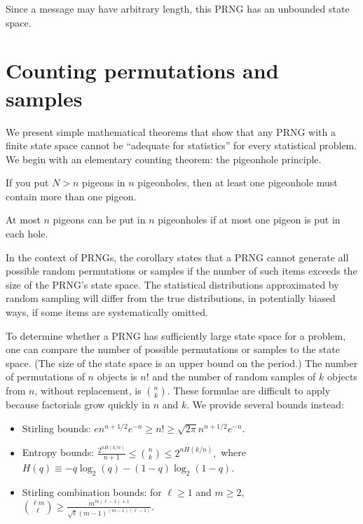\documentclass[graybox]{svmult}
\begin{document}
Since a message may have arbitrary length, this PRNG has an unbounded state space.


\section{Counting permutations and samples}
\label{sec:count}

We present simple mathematical theorems that show that any PRNG with a finite state space
cannot be ``adequate for statistics'' for every statistical problem.
We begin with an elementary counting theorem: the pigeonhole principle.


\begin{theorem}
If you put $N>n$ pigeons in $n$ pigeonholes, then at least one
pigeonhole must contain more than one pigeon.
\end{theorem}
\begin{corollary}
At most $n$ pigeons can be put in $n$ pigeonholes if at most
one pigeon is put in each hole.
\end{corollary}

In the context of PRNGs, the corollary states that a PRNG cannot generate all possible random permutations or samples if
the number of such items exceeds the size of the PRNG's state space.
The statistical distributions approximated by random sampling will differ from the true distributions,
in potentially biased ways, if some items are systematically omitted.

To determine whether a PRNG has sufficiently large state space for a problem, one can compare the number of
possible permutations or samples to the state space.
(The size of the state space is an upper bound on the period.)
The number of permutations of $n$ objects is $n!$ and the number of random samples of $k$ objects from $n$,
 without replacement, is $n \choose k$.
These formulae are difficult to apply because factorials grow quickly in $n$ and $k$.
We provide several bounds instead:
\begin{itemize}
\item Stirling bounds: $ e n^{n+1/2} e^{-n} \ge n! \ge \sqrt{2 \pi} n^{n+1/2} e^{-n}.$
\item Entropy bounds:
$ \frac{2^{nH(k/n)}}{n+1} \le {n \choose k} \le 2^{nH(k/n)},$ where $H(q) \equiv -q \log_2(q) - (1-q) \log_2 (1-q)$.
\item Stirling combination bounds:
for $\ell \ge 1$ and $m \ge 2$, $ { {\ell m } \choose { \ell }} \ge \frac{m^{m(\ell-1)+1}}{\sqrt{\ell} (m-1)^{(m-1)(\ell-1)}}. $
\end{itemize}
\end{document}
